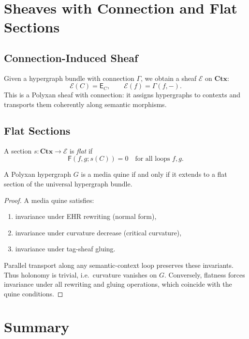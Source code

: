 \section{Sheaves with Connection and Flat Sections}

\subsection{Connection-Induced Sheaf}

Given a hypergraph bundle with connection $\Gamma$, we obtain a sheaf
$\mathscr{E}$ on $\mathbf{Ctx}$:
\[
\mathscr{E}(C) = \mathsf{E}_C,
\qquad
\mathscr{E}(f) = \Gamma(f,-).
\]
This is a Polyxan sheaf with connection: it assigns hypergraphs to contexts
and transports them coherently along semantic morphisms.

\subsection{Flat Sections}

A section $s : \mathbf{Ctx} \to \mathcal{E}$ is \emph{flat} if
\[
\mathsf{F}(f,g;s(C)) = 0
\quad\text{for all loops } f,g.
\]

\begin{theorem}
\label{thm:quines-flat}
A Polyxan hypergraph $G$ is a media quine if and only if it extends to a flat
section of the universal hypergraph bundle.
\end{theorem}

\begin{proof}
A media quine satisfies:
\begin{enumerate}
\item invariance under EHR rewriting (normal form),
\item invariance under curvature decrease (critical curvature),
\item invariance under tag-sheaf gluing.
\end{enumerate}
Parallel transport along any semantic-context loop preserves these invariants.
Thus holonomy is trivial, i.e.\ curvature vanishes on $G$.
Conversely, flatness forces invariance under all rewriting and gluing operations,
which coincide with the quine conditions.
\end{proof}

\section{Summary}

